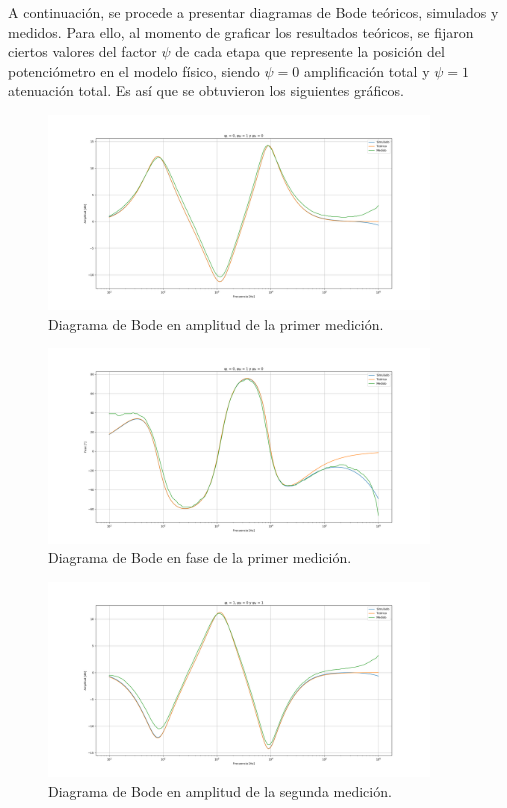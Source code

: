 A continuación, se procede a presentar diagramas de Bode teóricos, simulados y medidos. Para ello, al momento de graficar los resultados teóricos, se fijaron ciertos valores del factor $\psi$ de cada etapa que represente la posición del potenciómetro en el modelo físico, siendo $\psi = 0$ amplificación total y $\psi = 1$ atenuación total. Es así que se obtuvieron los siguientes gráficos.
\begin{figure}[H]	
	\centering
	\includegraphics[width=0.9\textwidth]{Imagenes/CBodes-Mod-1.png}
	\caption{Diagrama de Bode en amplitud de la primer medición.}
	\label{fig:CBodes-Mod-1}
\end{figure}
\begin{figure}[H]	
	\centering
	\includegraphics[width=0.9\textwidth]{Imagenes/CBodes-Ph-1.png}
	\caption{Diagrama de Bode en fase de la primer medición.}
	\label{fig:CBodes-Ph-1}
\end{figure}
\begin{figure}[H]	
	\centering
	\includegraphics[width=0.9\textwidth]{Imagenes/CBodes-Mod-2.png}
	\caption{Diagrama de Bode en amplitud de la segunda medición.}
	\label{fig:CBodes-Mod-2}
\end{figure}
